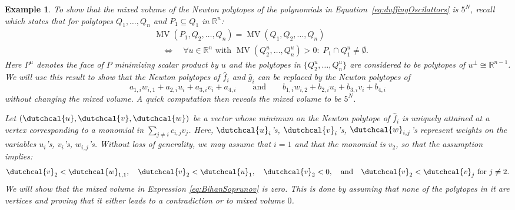 \documentclass[12pt,reqno,a4paper]{amsart}
\newcommand{\dcu}{\dutchcal{u}}
\newcommand{\dcv}{\dutchcal{v}}
\newcommand{\dcw}{\dutchcal{w}}
\theoremstyle{theoremstyle}
\theoremstyle{examplestyle}
\newtheorem{example}[theorem]{Example}
\theoremstyle{algorithmstyle}
\newcommand{\RR}{\mathbb{R}}
\DeclareMathOperator{\MV}{MV}
\begin{document}
\begin{example}
  To show that the mixed volume of the Newton polytopes of the polynomials in Equation~\eqref{eq:duffingOscilattors} is $5^N$, recall \cite[Proposition 3.2]{BihanSoprunov2019} which states that for polytopes $Q_1,\dots,Q_n$ and $P_1\subseteq Q_1$ in $\RR^n$:
  \begin{align}
      &\MV(P_1,Q_2,\dots,Q_n) = \MV(Q_1,Q_2,\dots,Q_n) \nonumber \\
      &\quad \Longleftrightarrow \quad \forall u\in\RR^n \text{ with } \MV(Q_2^u,\dots,Q_n^u)>0:\; P_1\cap Q_1^u\neq\emptyset. \label{eq:BihanSoprunov}
  \end{align}
  Here $P^u$ denotes the face of $P$ minimizing scalar product by $u$ and the polytopes in $\{Q_2^u,\dots,Q_n^u\}$ are considered to be polytopes of $u^\perp\cong\RR^{n-1}$. We will use this result to show that the Newton polytopes of $\hat f_i$ and $\hat g_i$ can be replaced by the Newton polytopes of
  \begin{equation*}
    a_{1,i}w_{i,1}+a_{2,i}u_{i}+a_{3,i}v_{i}+a_{4,i}\qquad \text{and}\qquad
    b_{1,i}w_{i,2}+b_{2,i}u_{i}+b_{3,i}v_{i}+b_{4,i}
  \end{equation*}
  without changing the mixed volume. A quick computation then reveals the mixed volume to be $5^N$.

  Let $(\dutchcal{u},\dutchcal{v},\dutchcal{w})$ be a vector whose minimum on the Newton polytope of $\hat f_i$ is uniquely attained at a vertex corresponding to a monomial in $\sum_{j\neq i}c_{i,j}v_j$. Here, $\dutchcal{u}_i$'s, $\dutchcal{v}_i$'s, $\dutchcal{w}_{i,j}$'s represent weights on the variables $u_i$'s, $v_i$'s, $w_{i,j}$'s. Without loss of generality, we may assume that $i=1$ and that the monomial is $v_2$, so that the assumption implies:
  \begin{equation*}\label{eq:f1assumption}
    \dcv_2<\dcw_{1,1},\quad \dcv_2<\dcu_1,\quad \dcv_2<0,\quad \text{and} \quad \dcv_2<\dcv_j \text{ for } j\neq 2.
  \end{equation*}
  We will show that the mixed volume in Expression \eqref{eq:BihanSoprunov} is zero. This is done by assuming that none of the polytopes in it are vertices and proving that it either leads to a contradiction or to mixed volume $0$.


\end{example}
\end{document}
